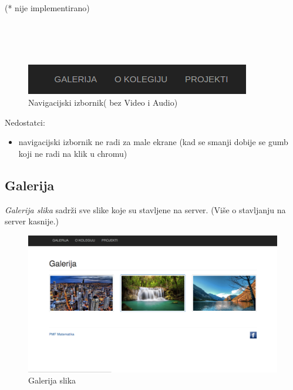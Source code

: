 \documentclass[]{article}
\begin{document}
\begin{footnotesize}
	(* nije implementirano)
\end{footnotesize}
\\
\\
\\
\begin{figure}[h]
	\centering
	\includegraphics[scale=0.5]{nav-bar}
	\caption{Navigacijski izbornik( bez Video i Audio)}
	\label{fig:mesh1}
\end{figure}

Nedostatci:
\begin{itemize}
	\item navigacijski izbornik ne radi za male ekrane (kad se smanji dobije se gumb koji ne radi na klik u chromu) 
\end{itemize}

\newpage
\subsection{Galerija}
\textit{Galerija slika} sadrži sve slike koje su stavljene na server.
(Više o stavljanju na server kasnije.)
\\
\begin{figure}[h]
	\centering
	\includegraphics[scale=0.23]{galerija}
	\caption{Galerija slika}
	\label{fig:mesh1}
\end{figure}
\end{document}
